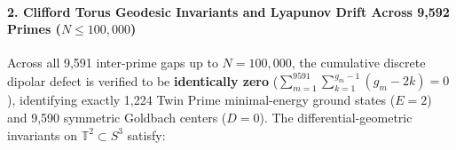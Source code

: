 \documentclass[
  11pt,
]{article}
\begin{document}
\paragraph{\texorpdfstring{2. Clifford Torus Geodesic Invariants and
Lyapunov Drift Across 9,592 Primes
(\(N \le 100{,}000\))}{2. Clifford Torus Geodesic Invariants and Lyapunov Drift Across 9,592 Primes (N \textbackslash le 100\{,\}000)}}\label{clifford-torus-geodesic-invariants-and-lyapunov-drift-across-9592-primes-n-le-100000}

Across all 9,591 inter-prime gaps up to \(N = 100{,}000\), the
cumulative discrete dipolar defect is verified to be \textbf{identically
zero} (\(\sum_{m=1}^{9591} \sum_{k=1}^{g_m-1} (g_m - 2k) = 0\)),
identifying exactly 1,224 Twin Prime minimal-energy ground states
(\(E = 2\)) and 9,590 symmetric Goldbach centers (\(D = 0\)). The
differential-geometric invariants on \(\mathbb{T}^2 \subset S^3\)
satisfy:
\end{document}
